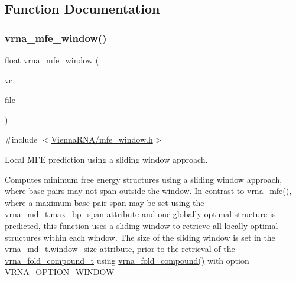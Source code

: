 \subsection{Function Documentation}
\mbox{\label{group__mfe__window_ga689df235a1915a1ad56e377383c044ce}} 
\subsubsection{\texorpdfstring{vrna\+\_\+mfe\+\_\+window()}{vrna\_mfe\_window()}}
{\footnotesize\ttfamily float vrna\+\_\+mfe\+\_\+window (\begin{DoxyParamCaption}\item[{\hyperlink{group__fold__compound_ga1b0cef17fd40466cef5968eaeeff6166}{vrna\+\_\+fold\+\_\+compound\+\_\+t} $\ast$}]{vc,  }\item[{F\+I\+LE $\ast$}]{file }\end{DoxyParamCaption})}



{\ttfamily \#include $<$\hyperlink{mfe__window_8h}{Vienna\+R\+N\+A/mfe\+\_\+window.\+h}$>$}



Local M\+FE prediction using a sliding window approach. 

Computes minimum free energy structures using a sliding window approach, where base pairs may not span outside the window. In contrast to \hyperlink{group__mfe__global_gabd3b147371ccf25c577f88bbbaf159fd}{vrna\+\_\+mfe()}, where a maximum base pair span may be set using the \hyperlink{group__model__details_a659e5fcc6e8c9f1a68e7de6548eef3b0}{vrna\+\_\+md\+\_\+t.\+max\+\_\+bp\+\_\+span} attribute and one globally optimal structure is predicted, this function uses a sliding window to retrieve all locally optimal structures within each window. The size of the sliding window is set in the \hyperlink{group__model__details_abea42f9229f8d8d6bcbedef316315bfc}{vrna\+\_\+md\+\_\+t.\+window\+\_\+size} attribute, prior to the retrieval of the \hyperlink{group__fold__compound_ga1b0cef17fd40466cef5968eaeeff6166}{vrna\+\_\+fold\+\_\+compound\+\_\+t} using \hyperlink{group__fold__compound_ga6601d994ba32b11511b36f68b08403be}{vrna\+\_\+fold\+\_\+compound()} with option \hyperlink{group__fold__compound_ga2b2a8009ccdccc3eb1571556261aee8e}{V\+R\+N\+A\+\_\+\+O\+P\+T\+I\+O\+N\+\_\+\+W\+I\+N\+D\+OW}

